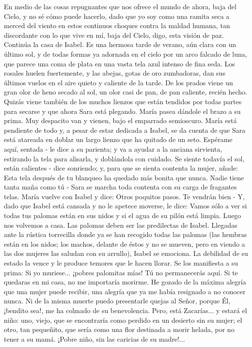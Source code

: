 \documentclass[12pt]{book} %
\begin{document}
En medio de las cosas repugnantes que nos ofrece el mundo de ahora, baja del Cielo, y no sé cómo puede hacerlo, dado que yo soy como una ramita seca a merced del viento en estos continuos choques contra la maldad humana, tan discordante con lo que vive en mí, baja del Cielo, digo, esta visión de paz. 
Continúa la casa de Isabel. Es una hermosa tarde de verano, aún clara con un último sol, y de todas formas ya adornada 
en el cielo por un arco falcado de luna, que parece una coma de plata en una vasta tela azul intenso de fina seda. 
Los rosales huelen fuertemente, y las abejas, gotas de oro zumbadoras, dan sus últimos vuelos en el aire quieto y 
caliente de la tarde. De los prados viene un gran olor de heno secado al sol, un olor casi de pan, de pan caliente, recién hecho. 
Quizás viene también de los muchos lienzos que están tendidos por todas partes para secarse y que ahora Sara está plegando. 
María pasea dándole el brazo a su prima. Muy despacito van y vienen, bajo el emparrado semioscuro. 
María está pendiente de todo y, a pesar de estar dedicada a Isabel, se da cuenta de que Sara está atareada en doblar un 
largo lienzo que ha quitado de un seto. 
Espérame aquí, sentada - le dice a su parienta; y va a ayudar a la anciana sirvienta, estirando la tela para alisarla, y 
doblándola con cuidado. 
Se siente todavía el sol, están calientes - dice sonriendo; y, para que se sienta contenta la mujer, añade: 
Esta tela después de tu blanqueo ha quedado más bonita que nunca. Nadie tiene tanta maña como tú - Sara se 
marcha toda contenta con su carga de fragantes telas. 
María vuelve con Isabel y dice: 
Otros poquitos pasos. Te vendrán bien - Y, dado que Isabel está cansada y no le apetece moverse, le dice: 
Vamos sólo a ver si todas tus palomas están en sus nidos y si el agua de su pilón está limpia. Luego nos volvemos a 
casa. 
Las palomas deben ser las predilectas de Isabel. Llegadas ante la rústica torrecilla donde ya se han recogido todas las palomas (las hembras están en los nidos; los machos, delante de éstos y no se mueven, pero en viendo a las dos mujeres las saludan con su arrullo), Isabel se emociona. La debilidad de su estado la vence y le produce temores que le hacen llorar. Se los manifiesta a su prima: 
Si yo muriese... ¡pobres palomitas mías! Tú no permanecerás aquí. Si te quedaras en mi casa, no me importaría morirme. He gozado de la máxima alegría que una mujer puede recibir, una alegría que ya me había resignado a no conocer nunca. Ni de la misma muerte puedo presentarle quejas al Señor, porque Él, ¡bendito sea!, me ha colmado de su benevolencia. Pero, está Zacarías... y estará el niño: uno, viejo, que se encontraría como perdido en un desierto sin su mujer; el otro, tan pequeñito, que sería como una flor destinada a morir helada, por no tener a su mamá. ¡Pobre niño, sin las caricias de su madre!... 
\end{document}
